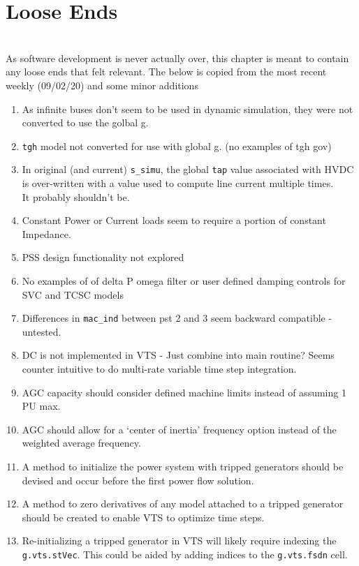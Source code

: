 \chapter{Loose Ends} \ \\
As software development is never actually over, this chapter is meant to contain any loose ends that felt relevant.
The below is copied from the most recent weekly (09/02/20) and some minor additions

\begin{enumerate}
	\item As infinite buses don't seem to be used in dynamic simulation, they were not converted to use the golbal g.
	\item \verb|tgh| model not converted for use with global g. (no examples of tgh gov)
	\item In original (and current) \verb|s_simu|, the global \verb|tap| value associated with HVDC is over-written with  a value used to compute line current multiple times. \\It probably shouldn't be.
	\item Constant Power or Current loads seem to require a portion of constant Impedance.
	\item PSS design functionality not explored
	\item No examples of of delta P omega filter or user defined damping controls for SVC and TCSC models
	\item Differences in \verb|mac_ind| between pst 2 and 3 seem backward compatible - untested.
	\item DC is not implemented in VTS - Just combine into main routine? Seems counter intuitive to do multi-rate variable time step integration.
	\item AGC capacity should consider defined machine limits instead of assuming 1 PU max.
	\item AGC should allow for a `center of inertia' frequency option instead of the weighted average frequency.
	\item A method to initialize the power system with tripped generators should be devised and occur before the first power flow solution.
	\item A method to zero derivatives of any model attached to a tripped generator should be created to enable VTS to optimize time steps.
	\item Re-initializing a tripped generator in VTS will likely require indexing the \verb|g.vts.stVec|. This could be aided by adding indices to the \verb|g.vts.fsdn| cell.
\end{enumerate}

